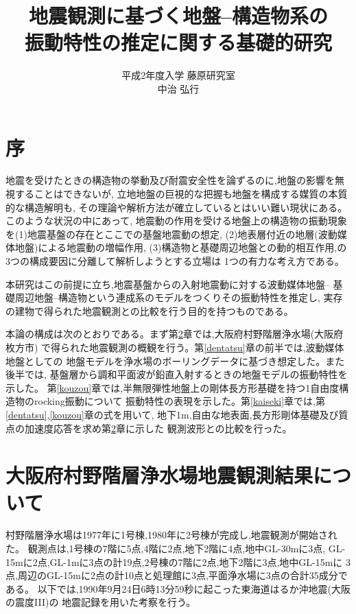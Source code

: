 \documentclass[titlepage]{jsarticle}
\title{地震観測に基づく地盤--構造物系の \\ 振動特性の推定に関する基礎的研究}
\author{平成2年度入学 藤原研究室 \\ 中治 弘行}
\date{}
\begin{document}
\maketitle
%
\setlength{\baselineskip}{25pt}

\tableofcontents
\listoffigures
\listoftables
\pagebreak

\section{序}
地震を受けたときの構造物の挙動及び耐震安全性を論ずるのに,地盤の影響を無視することはできないが,
立地地盤の巨視的な把握も地盤を構成する媒質の本質的な構造解明も,
その理論や解析方法が確立しているとはいい難い現状にある。このような状況の中にあって,
地震動の作用を受ける地盤上の構造物の振動現象を(1)地震基盤の存在とここでの基盤地震動の想定,
(2)地表層付近の地層(波動媒体地盤)による地震動の増幅作用,
(3)構造物と基礎周辺地盤との動的相互作用,の3つの構成要因に分離して解析しようとする立場は
1つの有力な考え方である。

本研究はこの前提に立ち,地震基盤からの入射地震動に対する波動媒体地盤--
基礎周辺地盤--構造物という連成系のモデルをつくりその振動特性を推定し,
実存の建物で得られた地震観測との比較を行う目的を持つものである。

本論の構成は次のとおりである。まず第\ref{kansoku}章では,大阪府村野階層浄水場(大阪府枚方市)
で得られた地震観測の概観を行う。第\ref{dentatsu}章の前半では,波動媒体地盤としての
地盤モデルを浄水場のボーリングデータに基づき想定した。また後半では,
基盤層から調和平面波が鉛直入射するときの地盤モデルの振動特性を示した。
第\ref{kouzou}章では,半無限弾性地盤上の剛体長方形基礎を持つ1自由度構造物のrocking振動について
振動特性の表現を示した。第\ref{kaiseki}章では,第\ref{dentatsu},\ref{kouzou}章の式を用いて,
地下1m,自由な地表面,長方形剛体基礎及び質点の加速度応答を求め第\ref{kansoku}章に示した
観測波形との比較を行った。

\section{大阪府村野階層浄水場地震観測結果について}\label{kansoku}
%
村野階層浄水場は1977年に1号棟,1980年に2号棟が完成し,地震観測が開始された。
観測点は,1号棟の7階に5点,4階に2点,地下2階に4点,地中GL-30mに3点,
GL-15mに2点,GL-1mに3点の計19点,2号棟の7階に2点,地下2階に3点,地中GL-15mに
3点,周辺のGL-15mに2点の計10点と処理館に3点,平面浄水場に3点の合計35成分である。
以下では,1990年9月24日6時13分59秒に起こった東海道はるか沖地震(大阪の震度III)の
地震記録を用いた考察を行う。
\end{document}
